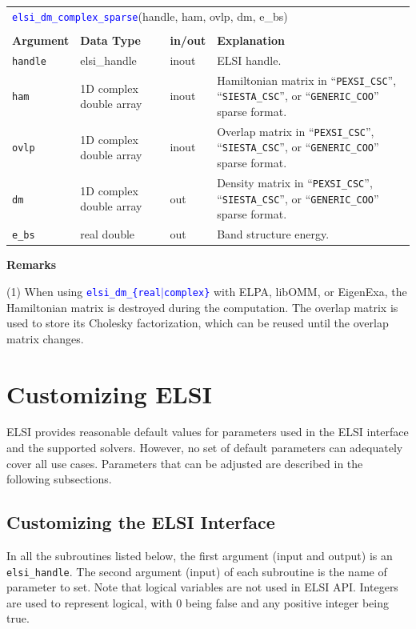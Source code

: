 \documentclass{report}
\newcommand{\api}[1]{\textcolor{blue}{\texttt{#1}}}
\begin{document}
\begin{tabular}[]{|p{20mm}|p{40mm}|p{10mm}|p{92mm}|}
\multicolumn{4}{l}{\api{elsi\_dm\_complex\_sparse}(handle, ham, ovlp, dm, e\_bs)}\\
\multicolumn{4}{l}{}\\
\hline
\multicolumn{1}{|l|}{\textbf{Argument}} & \multicolumn{1}{l|}{\textbf{Data Type}} & \multicolumn{1}{l|}{\textbf{in/out}} & \multicolumn{1}{l|}{\textbf{Explanation}}\\
\hline
\texttt{handle} & elsi\_handle            & inout & ELSI handle.\\
\hline
\texttt{ham}    & 1D complex double array & inout & Hamiltonian matrix in ``\texttt{PEXSI\_CSC}'', ``\texttt{SIESTA\_CSC}'', or ``\texttt{GENERIC\_COO}'' sparse format.\\
\hline
\texttt{ovlp}   & 1D complex double array & inout & Overlap matrix in ``\texttt{PEXSI\_CSC}'', ``\texttt{SIESTA\_CSC}'', or ``\texttt{GENERIC\_COO}'' sparse format.\\
\hline
\texttt{dm}     & 1D complex double array & out   & Density matrix in ``\texttt{PEXSI\_CSC}'', ``\texttt{SIESTA\_CSC}'', or ``\texttt{GENERIC\_COO}'' sparse format.\\
\hline
\texttt{e\_bs}  & real double             & out   & Band structure energy.\\
\hline
\end{tabular}

\textbf{Remarks}

(1) When using \api{elsi\_dm\_\{real$\vert$complex\}} with ELPA, libOMM, or EigenExa, the Hamiltonian matrix is destroyed during the computation. The overlap matrix is used to store its Cholesky factorization, which can be reused until the overlap matrix changes.

\section{Customizing ELSI}
\label{sec:setter}
ELSI provides reasonable default values for parameters used in the ELSI interface and the supported solvers. However, no set of default parameters can adequately cover all use cases. Parameters that can be adjusted are described in the following subsections.

\subsection{Customizing the ELSI Interface}
\label{subsec:setter_elsi}
In all the subroutines listed below, the first argument (input and output) is an \texttt{elsi\_handle}. The second argument (input) of each subroutine is the name of parameter to set. Note that logical variables are not used in ELSI API. Integers are used to represent logical, with 0 being false and any positive integer being true.
\end{document}
